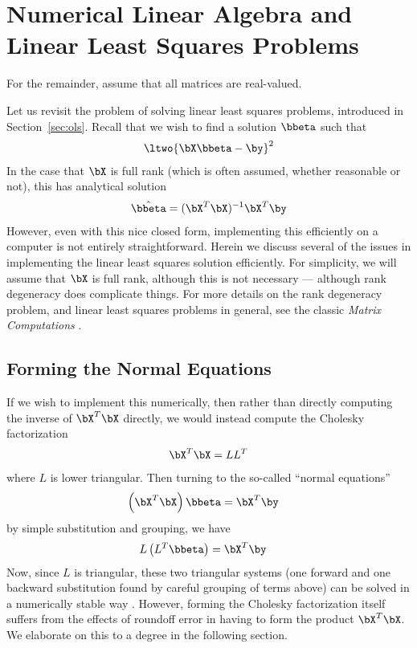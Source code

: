 

\chapter{Numerical Linear Algebra and Linear Least Squares Problems}
\label{apx:numlinalg}

For the remainder, assume that all matrices are real-valued.

Let us revisit the problem of solving linear least squares problems, introduced in Section~\ref{sec:ols}.  Recall that we wish to find a solution $\bbeta$ such that
\begin{align*}
\ltwo{ \bX\bbeta - \by }^2
\end{align*}
In the case that $\bX$ is full rank (which is often assumed, whether reasonable or not), this has analytical solution
\begin{align}
 \hat{\bbeta} = (\bX^T\bX)^{-1}\bX^T\by \label{math:ols2}
\end{align}
However, even with this nice closed form, implementing this efficiently on a computer is not entirely straightforward.  Herein we discuss several of the issues in implementing the linear least squares solution efficiently.  For simplicity, we will assume that $\bX$ is full rank, although this is not necessary --- although rank degeneracy does complicate things.  For more details on the rank degeneracy problem, and linear least squares problems in general, see the classic \emph{Matrix Computations} \citep{gvl}.




\section{Forming the Normal Equations}
\label{asec:nrmleq}
If we wish to implement this numerically, then rather than directly computing the inverse of $\bX^T\bX$ directly, we would instead compute the Cholesky factorization
\begin{align*}
\bX^T\bX = LL^T
\end{align*}
where $L$ is lower triangular.  Then turning to the so-called ``normal equations''
\begin{align}
 \left(\bX^T\bX\right)\bbeta &= \bX^T\by\label{math:normeq}
\end{align}
by simple substitution and grouping, we have
\begin{align*}
L\left(L^T\bbeta\right) &= \bX^T\by
\end{align*}
Now, since $L$ is triangular, these two triangular systems (one forward and one backward substitution found by careful grouping of terms above) can be solved in a numerically stable way \citep{numericalstab}.  However, forming the Cholesky factorization itself suffers from the effects of roundoff error in having to form the product $\bX^T\bX$.  We elaborate on this to a degree in the following section.




